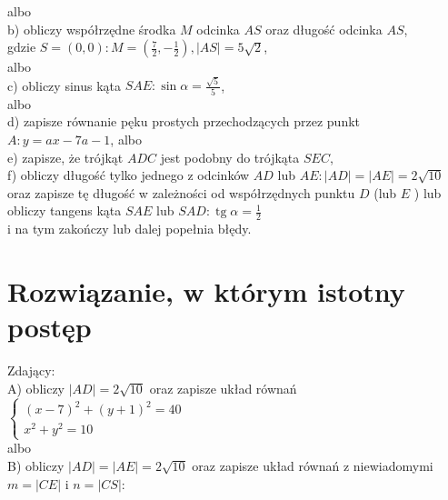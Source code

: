 \documentclass[10pt]{article}
\begin{document}
albo\\
b) obliczy współrzędne środka $M$ odcinka $A S$ oraz długość odcinka $A S$,\\
gdzie $S=(0,0): M=\left(\frac{7}{2},-\frac{1}{2}\right),|A S|=5 \sqrt{2}$,\\
albo\\
c) obliczy sinus kąta $S A E: \sin \alpha=\frac{\sqrt{5}}{5}$,\\
albo\\
d) zapisze równanie pęku prostych przechodzących przez punkt $A: y=a x-7 a-1$, albo\\
e) zapisze, że trójkąt $A D C$ jest podobny do trójkąta $S E C$,\\
f) obliczy długość tylko jednego z odcinków $A D$ lub $A E:|A D|=|A E|=2 \sqrt{10}$ oraz zapisze tę długość w zależności od współrzędnych punktu $D$ (lub $E$ ) lub obliczy tangens kąta $S A E$ lub $S A D: \operatorname{tg} \alpha=\frac{1}{2}$\\
i na tym zakończy lub dalej popełnia błędy.

\section*{Rozwiązanie, w którym istotny postęp}
Zdający:\\
A) obliczy $|A D|=2 \sqrt{10}$ oraz zapisze układ równań $\left\{\begin{array}{l}(x-7)^{2}+(y+1)^{2}=40 \\ x^{2}+y^{2}=10\end{array}\right.$\\
albo\\
B) obliczy $|A D|=|A E|=2 \sqrt{10}$ oraz zapisze układ równań z niewiadomymi $m=|C E|$ i $n=|C S|:$
\end{document}
